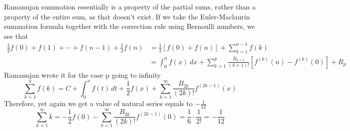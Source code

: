Ramanujan summation essentially is a property of the partial sums, rather than a property of the entire sum,
as that doesn't exist.
If we take the Euler-Maclaurin summation formula together with the correction rule using Bernoulli numbers, we see that
\begin{align*}
    \frac {1}{2}f(0)+f(1)+\cdots +f(n-1)+{\frac {1}{2}}f(n)
    &={\frac {1}{2}}[f(0)+f(n)]+\sum _{k=1}^{n-1}f(k)\\
    &=\int _{0}^{n}f(x)\,dx+\sum _{k=1}^{p}{\frac {B_{k+1}}{(k+1)!}}\left[f^{(k)}(n)-f^{(k)}(0)\right]+R_{p}
\end{align*}
Ramanujan wrote it for the case p going to infinity
\begin{equation*}
    \sum _{k=1}^{x}f(k)=C+\int _{0}^{x}f(t)\,dt+{\frac {1}{2}}f(x)+\sum_{k=1}^{\infty }{\frac {B_{2k}}{(2k)!}}f^{(2k-1)}(x)
\end{equation*}
Therefore, yet again we get a value of natural series equals to $-\frac{1}{12}$
\begin{equation*}
    \sum_{k=1}^{\infty} k =-{\frac {1}{2}}f(0)-\sum _{k=1}^{\infty }{\frac {B_{2k}}{(2k)!}}f^{(2k-1)}(0) = \frac {1}{6}\cdot {\frac {1}{2!}}=-\frac {1}{12}
\end{equation*}